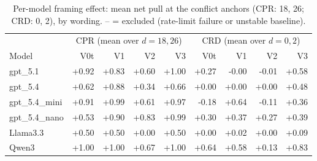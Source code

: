 \begin{table}[t]
\centering
\caption{Per-model framing effect: mean net pull at the conflict anchors (CPR: 18, 26; CRD: 0, 2), by wording. -- = excluded (rate-limit failure or unstable baseline).}
\label{tab:framing_permodel}
\small
\begin{tabular}{lrrrrrrrr}
\toprule
 & \multicolumn{4}{c}{CPR (mean over $d{=}18,26$)} & \multicolumn{4}{c}{CRD (mean over $d{=}0,2$)} \\
Model & V0t & V1 & V2 & V3 & V0t & V1 & V2 & V3 \\
\midrule
gpt\_5.1 & +0.92 & +0.83 & +0.60 & +1.00 & +0.27 & -0.00 & -0.01 & +0.58 \\
gpt\_5.4 & +0.62 & +0.88 & +0.34 & +0.66 & +0.00 & +0.00 & +0.00 & +0.48 \\
gpt\_5.4\_mini & +0.91 & +0.99 & +0.61 & +0.97 & -0.18 & +0.64 & -0.11 & +0.36 \\
gpt\_5.4\_nano & +0.53 & +0.90 & +0.83 & +0.99 & +0.30 & +0.37 & +0.27 & +0.39 \\
Llama3.3 & +0.50 & +0.50 & +0.00 & +0.50 & +0.00 & +0.02 & +0.00 & +0.09 \\
Qwen3 & +1.00 & +1.00 & +0.67 & +1.00 & +0.64 & +0.58 & +0.13 & +0.83 \\
\bottomrule
\end{tabular}
\end{table}
